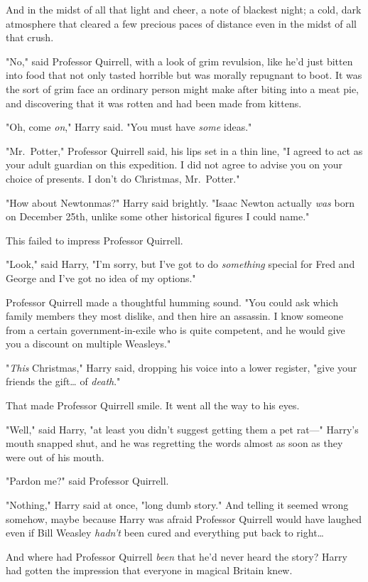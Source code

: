And in the midst of all that light and cheer, a note of blackest night; a cold, dark atmosphere that cleared a few precious paces of distance even in the midst of all that crush.

"No," said Professor Quirrell, with a look of grim revulsion, like he'd just bitten into food that not only tasted horrible but was morally repugnant to boot. It was the sort of grim face an ordinary person might make after biting into a meat pie, and discovering that it was rotten and had been made from kittens.

"Oh, come \emph{on}," Harry said. "You must have \emph{some} ideas."

"Mr.~Potter," Professor Quirrell said, his lips set in a thin line, "I agreed to act as your adult guardian on this expedition. I did not agree to advise you on your choice of presents. I don't do Christmas, Mr.~Potter."

"How about Newtonmas?" Harry said brightly. "Isaac Newton actually \emph{was} born on December 25th, unlike some other historical figures I could name."

This failed to impress Professor Quirrell.

"Look," said Harry, "I'm sorry, but I've got to do \emph{something} special for Fred and George and I've got no idea of my options."

Professor Quirrell made a thoughtful humming sound. "You could ask which family members they most dislike, and then hire an assassin. I know someone from a certain government-in-exile who is quite competent, and he would give you a discount on multiple Weasleys."

"\emph{This} Christmas," Harry said, dropping his voice into a lower register, "give your friends the gift{\ldots} of \emph{death}."

That made Professor Quirrell smile. It went all the way to his eyes.

"Well," said Harry, "at least you didn't suggest getting them a pet rat---" Harry's mouth snapped shut, and he was regretting the words almost as soon as they were out of his mouth.

"Pardon me?" said Professor Quirrell.

"Nothing," Harry said at once, "long dumb story." And telling it seemed wrong somehow, maybe because Harry was afraid Professor Quirrell would have laughed even if Bill Weasley \emph{hadn't} been cured and everything put back to right{\ldots}

And where had Professor Quirrell \emph{been} that he'd never heard the story? Harry had gotten the impression that everyone in magical Britain knew.

